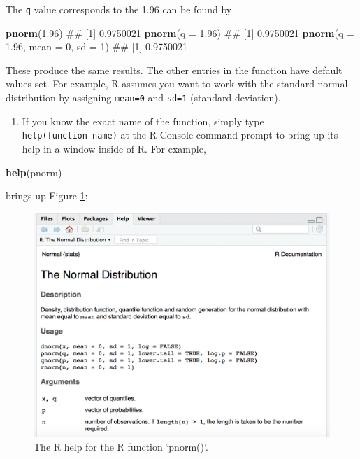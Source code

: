 \documentclass[]{book}
\newenvironment{Shaded}{\begin{snugshade}}{\end{snugshade}}
\newcommand{\KeywordTok}[1]{\textcolor[rgb]{0.13,0.29,0.53}{\textbf{#1}}}
\newcommand{\DataTypeTok}[1]{\textcolor[rgb]{0.13,0.29,0.53}{#1}}
\newcommand{\DecValTok}[1]{\textcolor[rgb]{0.00,0.00,0.81}{#1}}
\newcommand{\FloatTok}[1]{\textcolor[rgb]{0.00,0.00,0.81}{#1}}
\newcommand{\NormalTok}[1]{#1}
\providecommand{\tightlist}{%
  \setlength{\itemsep}{0pt}\setlength{\parskip}{0pt}}
\begin{document}
The \texttt{q} value corresponds to the 1.96 can be found by

\begin{Shaded}
\begin{Highlighting}[]
\KeywordTok{pnorm}\NormalTok{(}\FloatTok{1.96}\NormalTok{)}
\NormalTok{## [1] 0.9750021}
\KeywordTok{pnorm}\NormalTok{(}\DataTypeTok{q =} \FloatTok{1.96}\NormalTok{)}
\NormalTok{## [1] 0.9750021}
\KeywordTok{pnorm}\NormalTok{(}\DataTypeTok{q =} \FloatTok{1.96}\NormalTok{, }\DataTypeTok{mean =} \DecValTok{0}\NormalTok{, }\DataTypeTok{sd =} \DecValTok{1}\NormalTok{)}
\NormalTok{## [1] 0.9750021}
\end{Highlighting}
\end{Shaded}

These produce the same results. The other entries in the function have
default values set. For example, R assumes you want to work with the
standard normal distribution by assigning \texttt{mean=0} and
\texttt{sd=1} (standard deviation).

\begin{enumerate}
\def\labelenumi{\arabic{enumi}.}
\setcounter{enumi}{1}
\tightlist
\item
  If you know the exact name of the function, simply type
  \texttt{help(function\ name)} at the R Console command prompt to bring
  up its help in a window inside of R. For example,
\end{enumerate}

\begin{Shaded}
\begin{Highlighting}[]
\KeywordTok{help}\NormalTok{(pnorm)}
\end{Highlighting}
\end{Shaded}

brings up Figure \ref{fig:Rhelp}:

\begin{figure}

{\centering \includegraphics[width=0.9\linewidth]{figures/Rhelp} 

}

\caption{The R help for the R function `pnorm()`.}\label{fig:Rhelp}
\end{figure}
\end{document}
